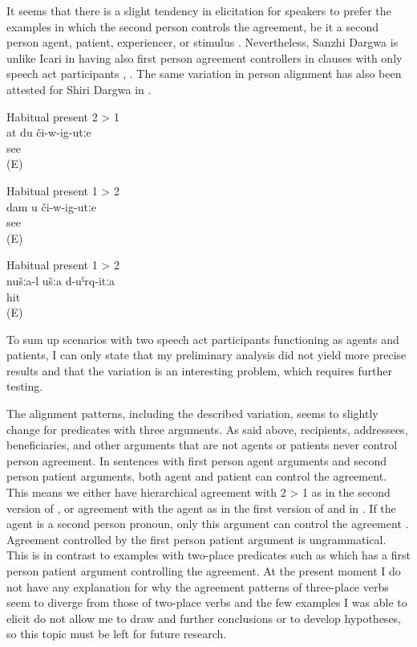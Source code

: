 It seems that there is a slight tendency in elicitation for speakers to prefer the examples in which the second person controls the agreement, be it a second person agent, patient, experiencer, or stimulus . Nevertheless, Sanzhi Dargwa is unlike Icari in having also first person agreement controllers in clauses with only speech act participants , . The same variation in person alignment has also been attested for Shiri Dargwa in \citet{Belyaev2013}.
%
\begin{exe}
		\ex	Habitual present 2 > 1\\	\label{ex:You see me HP21@21b}
		\gll	at	du	či-w-ig-utːe\\
					see\\
		\glt	{} (E)
		
		\ex	Habitual present 1 > 2\\	\label{ex:I see you HP12@21a}
		\gll	dam	u	či-w-ig-utːe\\
					see\\
		\glt	{} (E)

		\ex	Habitual present 1 > 2\\	\label{ex:‎We hit you HP12}
		\gll	nušːa-l	ušːa	d-uˁrq-itːa\\
					hit\\
		\glt	{} (E)
\end{exe}

To sum up scenarios with two speech act participants functioning as agents and patients, I can only state that my preliminary analysis did not yield more precise results and that the variation is an interesting problem, which requires further testing.

The alignment patterns, including the described variation, seems to slightly change for predicates with three arguments. As said above, recipients, addressees, beneficiaries, and other arguments that are not agents or patients never control person agreement. In sentences with first person agent arguments and second person patient arguments, both agent and patient can control the agreement. This means we either have hierarchical agreement with 2 > 1 as in the second version of , or agreement with the agent as in the first version of  and in . If the agent is a second person pronoun, only this argument can control the agreement . Agreement controlled by the first person patient argument is ungrammatical. This is in contrast to examples with two-place predicates such as  which has a first person patient argument controlling the agreement. At the present moment I do not have any explanation for why the agreement patterns of three-place verbs seem to diverge from those of two-place verbs and the few examples I was able to elicit do not allow me to draw and further conclusions or to develop hypotheses, so this topic must be left for future research.


